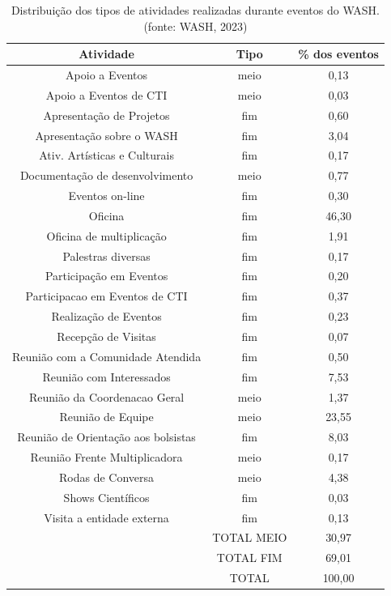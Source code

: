 \begin{table}[htb]
\tiny
\caption{\label{416f97179fdef34d3c4088ced3467a0b46211d34}Distribuição dos tipos de atividades realizadas durante eventos do WASH. (fonte: WASH, 2023)}

\centering
\begin{tabular}{|c|c|c|}
\hline
Atividade  &  Tipo  &  \% dos eventos \\
\hline
Apoio a Eventos  &  meio  &  0,13 \\
Apoio a Eventos de CTI  &  meio  &  0,03 \\
Apresentação de Projetos  &  fim  &  0,60 \\
Apresentação sobre o WASH  &  fim  &  3,04 \\
Ativ. Artísticas e Culturais  &  fim  &  0,17 \\
Documentação de desenvolvimento  &  meio  &  0,77 \\
Eventos on-line  &  fim  &  0,30 \\
Oficina  &  fim  &  46,30 \\
Oficina de multiplicação  &  fim  &  1,91 \\
Palestras diversas  &  fim  &  0,17 \\
Participação em Eventos  &  fim  &  0,20 \\
Participacao em Eventos de CTI  &  fim  &  0,37 \\
Realização de Eventos  &  fim  &  0,23 \\
Recepção de Visitas  &  fim  &  0,07 \\
Reunião com a Comunidade Atendida  &  fim  &  0,50 \\
Reunião com Interessados  &  fim  &  7,53 \\
Reunião da Coordenacao Geral  &  meio  &  1,37 \\
Reunião de Equipe  &  meio  &  23,55 \\
Reunião de Orientação aos bolsistas  &  fim  &  8,03 \\
Reunião Frente Multiplicadora  &  meio  &  0,17 \\
Rodas de Conversa  &  meio  &  4,38 \\
Shows Científicos  &  fim  &  0,03 \\
Visita a entidade externa  &  fim  &  0,13 \\
\hline
  &  TOTAL MEIO  &  30,97 \\
  &  TOTAL FIM  &  69,01  \\
  &  TOTAL  &  100,00 \\
\hline
\end{tabular}
\end{table}


